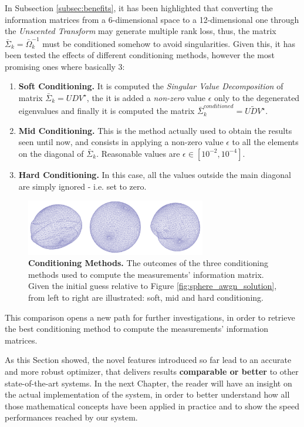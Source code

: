 In Subsection \ref{subsec:benefits}, it has been highlighted that converting the information matrices from a 6-dimensional space to a 12-dimensional one through the \textit{Unscented Transform} may generate multiple rank loss, thus, the matrix $\bar{\Sigma}_k = \bar{\Omega}_k^{-1}$ must be conditioned somehow to avoid singularities. Given this, it has been tested the effects of different conditioning methods, however the most promising ones where basically 3:

\begin{enumerate}
    \item \textbf{Soft Conditioning.} It is computed the \textit{Singular Value Decomposition} of matrix $\bar{\Sigma}_k = UDV^\star$, the it is added a \textit{non-zero} value $\epsilon$ only to the degenerated eigenvalues and finally it is computed the matrix $\bar{\Sigma}_k^{conditioned} = U\tilde{D}V^\star$.
    \item \textbf{Mid Conditioning.} This is the method actually used to obtain the results seen until now, and consists in applying a non-zero value $\epsilon$ to all the elements on the diagonal of $\bar{\Sigma}_k$. Reasonable values are $\epsilon \in [10^{-2}, 10^{-4}]$.
    \item \textbf{Hard Conditioning.} In this case, all the values outside the main diagonal are simply ignored - i.e. set to zero. 
\end{enumerate}

\begin{figure}[!hbt]
    \centering    
    \includegraphics[width=0.7\textwidth]{figures/04_solvingSe3/viewer_sphere_awgn_CONDITIONINGS.png}
    \caption{\textbf{Conditioning Methods.} The outcomes of the three conditioning methods used to compute the measurements' information matrix. Given the initial guess relative to Figure \ref{fig:sphere_awgn_solution}, from left to right are illustrated: soft, mid and hard conditioning.}
    \label{fig:sphere_conditionings}
\end{figure}

This comparison opens a new path for further investigations, in order to retrieve the best conditioning method to compute the measurements' information matrices.

\vspace{15px}

As this Section showed, the novel features introduced so far lead to an accurate and more robust optimizer, that delivers results \textbf{comparable or better} to other state-of-the-art systems. In the next Chapter, the reader will have an insight on the actual implementation of the system, in order to better understand how all those mathematical concepts have been applied in practice and to show the speed performances reached by our system.
